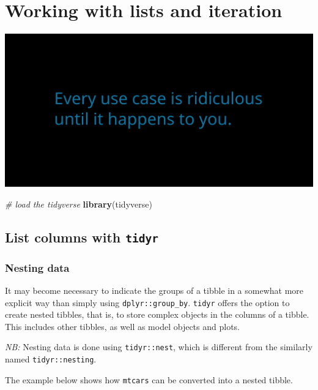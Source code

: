 \documentclass[]{book}
\newenvironment{Shaded}{}{}
\newcommand{\CommentTok}[1]{\textcolor[rgb]{0.38,0.63,0.69}{\textit{#1}}}
\newcommand{\KeywordTok}[1]{\textcolor[rgb]{0.00,0.44,0.13}{\textbf{#1}}}
\newcommand{\NormalTok}[1]{#1}
\begin{document}
\hypertarget{working-with-lists-and-iteration}{%
\chapter{Working with lists and iteration}\label{working-with-lists-and-iteration}}

\includegraphics{opening-image.png}

\begin{Shaded}
\begin{Highlighting}[]
\CommentTok{# load the tidyverse}
\KeywordTok{library}\NormalTok{(tidyverse)}
\end{Highlighting}
\end{Shaded}

\hypertarget{list-columns-with-tidyr}{%
\section{\texorpdfstring{List columns with \texttt{tidyr}}{List columns with tidyr}}\label{list-columns-with-tidyr}}

\hypertarget{nesting-data}{%
\subsection{Nesting data}\label{nesting-data}}

It may become necessary to indicate the groups of a tibble in a somewhat more explicit way than simply using \texttt{dplyr::group\_by}. \texttt{tidyr} offers the option to create nested tibbles, that is, to store complex objects in the columns of a tibble. This includes other tibbles, as well as model objects and plots.

\emph{NB:} Nesting data is done using \texttt{tidyr::nest}, which is different from the similarly named \texttt{tidyr::nesting}.

The example below shows how \texttt{mtcars} can be converted into a nested tibble.
\end{document}
